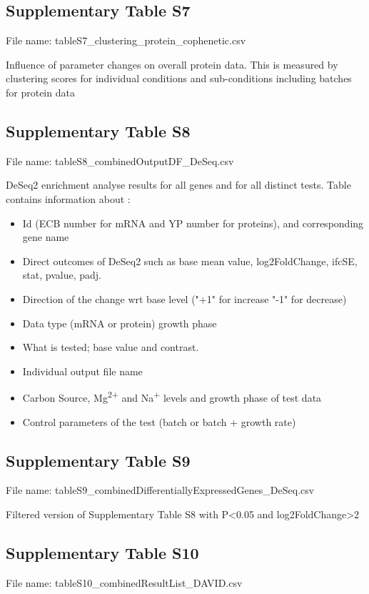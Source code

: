 \documentclass[a4paper]{article}
\begin{document}
\subsection*{Supplementary Table S7}
File name: tableS7\_clustering\_protein\_cophenetic.csv

Influence of parameter changes on overall protein data. This is measured by clustering scores for individual conditions and sub-conditions including batches for protein data

\subsection*{Supplementary Table S8}
File name: tableS8\_combinedOutputDF\_DeSeq.csv

DeSeq2 enrichment analyse results for all genes and for all distinct tests. 
Table contains information about :
\begin{itemize}
\item Id (ECB number for mRNA and YP number for proteins), and corresponding gene name
\item Direct outcomes of DeSeq2 such as base mean value, log2FoldChange, ifcSE, stat, pvalue, padj.
\item Direction of the change wrt base level ("+1" for increase "-1" for decrease)
\item Data type (mRNA or protein)
growth phase
\item What is tested; base value and contrast.
\item Individual output file name 
\item Carbon Source, Mg\textsuperscript{2+} and Na\textsuperscript{+} levels and growth phase of test data 
\item Control parameters of the test (batch or batch + growth rate)
\end{itemize}

\subsection*{Supplementary Table S9}
File name: tableS9\_combinedDifferentiallyExpressedGenes\_DeSeq.csv

Filtered version of Supplementary Table S8 with P<0.05 and log2FoldChange>2

\subsection*{Supplementary Table S10}
File name: tableS10\_combinedResultList\_DAVID.csv
\end{document}
